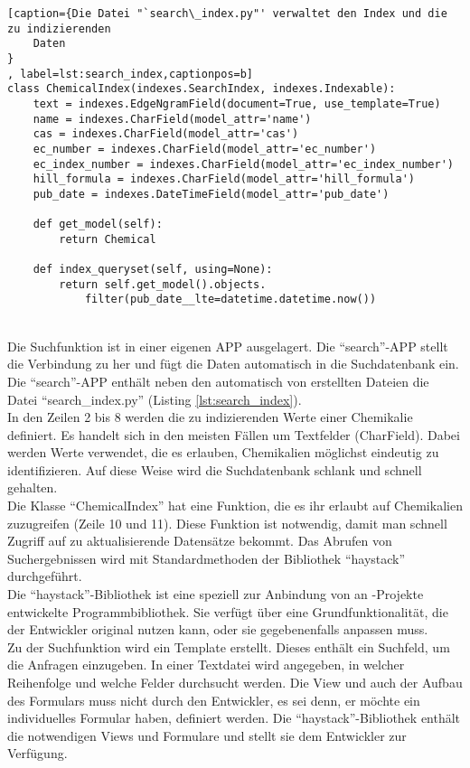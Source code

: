 \begin{lstlisting}[caption={Die Datei "`search\_index.py"' verwaltet den Index und die zu indizierenden
    Daten
} 
, label=lst:search_index,captionpos=b]
class ChemicalIndex(indexes.SearchIndex, indexes.Indexable):
    text = indexes.EdgeNgramField(document=True, use_template=True)
    name = indexes.CharField(model_attr='name')
    cas = indexes.CharField(model_attr='cas')
    ec_number = indexes.CharField(model_attr='ec_number')
    ec_index_number = indexes.CharField(model_attr='ec_index_number')
    hill_formula = indexes.CharField(model_attr='hill_formula')
    pub_date = indexes.DateTimeField(model_attr='pub_date')

    def get_model(self):
        return Chemical

    def index_queryset(self, using=None):
        return self.get_model().objects.
            filter(pub_date__lte=datetime.datetime.now())
\end{lstlisting}
\\
Die Suchfunktion ist in einer eigenen \ac{APP} ausgelagert. Die
"`search"'-\ac{APP} stellt die Verbindung zu  her und fügt
die Daten automatisch in die Suchdatenbank ein.
\\
Die "`search"'-\ac{APP} enthält neben den automatisch von 
erstellten Dateien die Datei "`search\_index.py"' (Listing
\ref{lst:search_index}).
\\
In den Zeilen 2 bis 8 werden die zu indizierenden Werte einer Chemikalie
definiert. Es handelt sich in den meisten Fällen um Textfelder (CharField).
Dabei werden Werte verwendet, die es erlauben, Chemikalien möglichst eindeutig
zu identifizieren. Auf diese Weise wird die Suchdatenbank schlank und
schnell gehalten.
\\
Die Klasse "`ChemicalIndex"' hat eine Funktion, die es ihr erlaubt
auf Chemikalien zuzugreifen (Zeile 10 und 11). Diese Funktion ist
notwendig, damit man schnell Zugriff auf zu aktualisierende Datensätze bekommt.
Das Abrufen von Suchergebnissen wird mit Standardmethoden der Bibliothek
"`haystack"' durchgeführt.
\\
Die "`haystack"'-Bibliothek ist eine speziell zur Anbindung von
 an -Projekte entwickelte Programmbibliothek.
Sie verfügt über eine Grundfunktionalität, die der Entwickler original nutzen
kann, oder sie gegebenenfalls anpassen muss.
\\
Zu der Suchfunktion wird ein Template erstellt. Dieses enthält ein
Suchfeld, um die Anfragen einzugeben. In einer Textdatei wird 
angegeben, in welcher Reihenfolge und welche Felder
durchsucht werden. Die View und auch der Aufbau des Formulars muss
nicht durch den Entwickler, es sei denn, er möchte ein individuelles Formular
haben, definiert werden. Die "`haystack"'-Bibliothek enthält die notwendigen
Views und Formulare und stellt sie dem Entwickler zur Verfügung.



